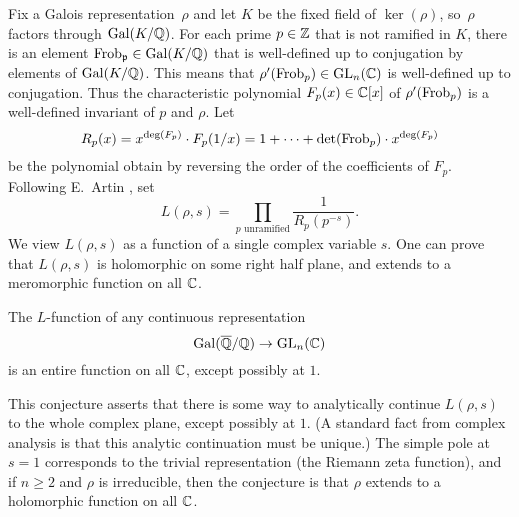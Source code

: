 {Fix a Galois representation~$\rho$ and let $K$ be the fixed field of
$\ker(\rho)$, so~$\rho$ factors through $\operatorname{Gal}(K/\mathbb{Q})$.  For each prime
$p\in\mathbb{Z}$ that is not ramified in $K$, there is an element
$\operatorname{Frob}_{\mathfrak{p}}\in\operatorname{Gal}(K/\mathbb{Q})$ that is well-defined up to conjugation by
elements of $\operatorname{Gal}(K/\mathbb{Q})$.  This means that $\rho'(\operatorname{Frob}_p)\in
\operatorname{GL}_n(\mathbb{C})$ is well-defined up to conjugation.  Thus the characteristic
polynomial $F_p(x)\in\mathbb{C}[x]$ of $\rho'(\operatorname{Frob}_p)$ is a well-defined
invariant of $p$ and $\rho$.  Let
$$
	R_p(x)
	= x^{\deg(F_p)}\cdot F_p(1/x)
	= 1 + \cdots + \det(\operatorname{Frob}_p)\cdot x^{\deg(F_p)}
$$
be the polynomial obtain
by reversing the order of the coefficients of $F_p$.
Following E.~Artin \cite{artin:conjecture, artin:conjecture2}, set
\begin{equation}\label{eqn:artin}
	L(\rho,s) = \prod_{p\text{ unramified}}\frac{1}{R_p(p^{-s})}.
\end{equation}
We view $L(\rho,s)$ as a function of a single complex variable $s$.
One can prove that $L(\rho,s)$ is holomorphic on some right
half plane, and extends to a meromorphic function on all $\mathbb{C}$.
\begin{conjecture}[Artin]\label{conj:artin}
	The $L$-function of any continuous representation
	$$
		\operatorname{Gal}(\overline{\mathbb{Q}}/\mathbb{Q})\to\operatorname{GL}_n(\mathbb{C})
	$$
	is an entire function on all $\mathbb{C}$, except possibly at $1$.
\end{conjecture}
This conjecture asserts that there is some way to analytically continue
$L(\rho,s)$ to the whole complex plane, except possibly at $1$.
(A standard fact from complex analysis is that this analytic
continuation must be unique.)
The simple pole at $s=1$ corresponds to the trivial representation (the
Riemann zeta function), and if $n\geq 2$ and $\rho$ is irreducible,
then the conjecture is that $\rho$ extends to a holomorphic function
on all $\mathbb{C}$.

}
